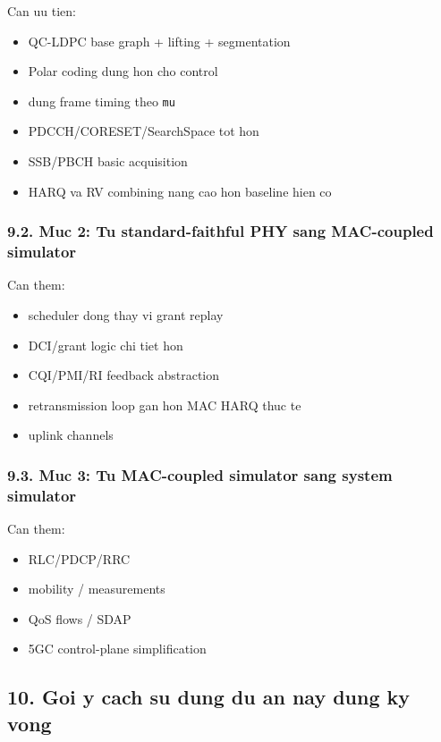 \documentclass[
  vietnamese,
  a4paper,
  11pt]{article}
\providecommand{\tightlist}{%
  \setlength{\itemsep}{0pt}\setlength{\parskip}{0pt}}
\begin{document}
Can uu tien:

\begin{itemize}
\tightlist
\item
  QC-LDPC base graph + lifting + segmentation
\item
  Polar coding dung hon cho control
\item
  dung frame timing theo \texttt{mu}
\item
  PDCCH/CORESET/SearchSpace tot hon
\item
  SSB/PBCH basic acquisition
\item
  HARQ va RV combining nang cao hon baseline hien co
\end{itemize}

\subsubsection{9.2. Muc 2: Tu standard-faithful PHY sang MAC-coupled
simulator}\label{muc-2-tu-standard-faithful-phy-sang-mac-coupled-simulator}

Can them:

\begin{itemize}
\tightlist
\item
  scheduler dong thay vi grant replay
\item
  DCI/grant logic chi tiet hon
\item
  CQI/PMI/RI feedback abstraction
\item
  retransmission loop gan hon MAC HARQ thuc te
\item
  uplink channels
\end{itemize}

\subsubsection{9.3. Muc 3: Tu MAC-coupled simulator sang system
simulator}\label{muc-3-tu-mac-coupled-simulator-sang-system-simulator}

Can them:

\begin{itemize}
\tightlist
\item
  RLC/PDCP/RRC
\item
  mobility / measurements
\item
  QoS flows / SDAP
\item
  5GC control-plane simplification
\end{itemize}

\subsection{10. Goi y cach su dung du an nay dung ky
vong}\label{goi-y-cach-su-dung-du-an-nay-dung-ky-vong}
\end{document}
